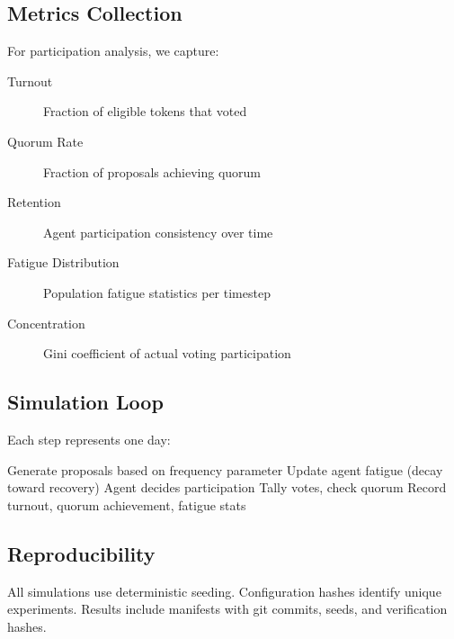 \subsection{Metrics Collection}

For participation analysis, we capture:

\begin{description}
    \item[Turnout] Fraction of eligible tokens that voted
    \item[Quorum Rate] Fraction of proposals achieving quorum
    \item[Retention] Agent participation consistency over time
    \item[Fatigue Distribution] Population fatigue statistics per timestep
    \item[Concentration] Gini coefficient of actual voting participation
\end{description}

\subsection{Simulation Loop}

Each step represents one day:

\begin{algorithmic}
    \STATE Generate proposals based on frequency parameter
    \STATE Update agent fatigue (decay toward recovery)
            \STATE Agent decides participation
        \ENDFOR
        \STATE Tally votes, check quorum
    \ENDFOR
    \STATE Record turnout, quorum achievement, fatigue stats
\ENDFOR
\end{algorithmic}

\subsection{Reproducibility}

All simulations use deterministic seeding. Configuration hashes identify unique experiments. Results include manifests with git commits, seeds, and verification hashes.
